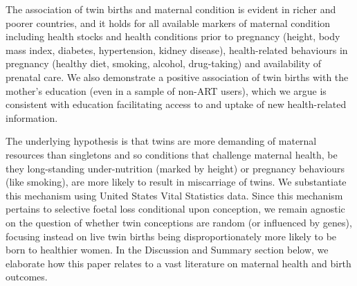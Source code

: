 \documentclass[11pt]{article}
\begin{document}
The association of twin births and maternal condition is evident in richer and poorer countries, and it holds for all available markers of maternal condition including health stocks and health conditions prior to pregnancy (height, body mass index, diabetes, hypertension, kidney disease), health-related behaviours in pregnancy (healthy diet, smoking, alcohol, drug-taking) and availability of prenatal care. We also demonstrate a positive association of twin births with the mother's education (even in a sample of non-ART users), which we argue is consistent with education facilitating access to and uptake of new health-related information\cite{Kenkel1991,CutlerLlerasMuney2010}. 

The underlying hypothesis is that twins are more demanding of maternal resources than singletons and so conditions that challenge maternal health, be they long-standing under-nutrition (marked by height) or pregnancy behaviours (like smoking), are more likely to result in miscarriage of twins. We substantiate this mechanism using United States Vital Statistics data. Since this mechanism pertains to selective foetal loss conditional upon conception, we remain agnostic on the question of whether twin conceptions are random (or influenced by genes), focusing instead on live twin births being disproportionately more likely to be born to healthier women. In the Discussion and Summary section below, we elaborate how this paper relates to a vast literature on maternal health and birth outcomes.
\end{document}
